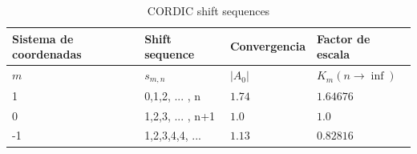 \documentclass[10pt,a4paper]{book}
\begin{document}
\begin{table}[h!]
\centering
\begin{tabular}{llll}
   \hline
   Sistema de coordenadas  &  Shift sequence       &  Convergencia   &  Factor de escala                 \\ \hline \hline
   $m$                     &  $s_{m,n}$            &  $|A_0|$        &  $K_{m} (n \rightarrow \inf)$     \\ \hline
   1                       &  0,1,2, ... , n       &  $ 1.74$        &  $1.64676$                        \\ \hline
   0                       &  1,2,3, ... , n+1     &  $ 1.0 $        &  $1.0    $                        \\ \hline
   -1                      &  1,2,3,4,4, ...       &  $ 1.13$        &  $0.82816$                        \\ \hline \hline
\end{tabular}
\caption{CORDIC shift sequences}
\label{tab:table_shift_seq}
\end{table}
\end{document}

